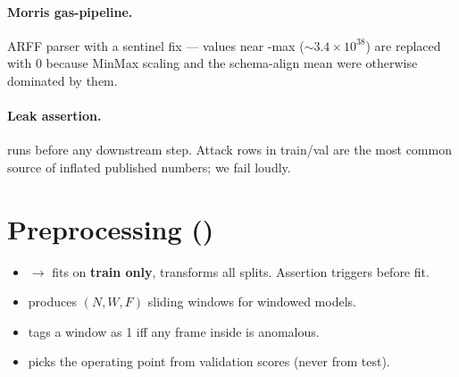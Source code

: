 \paragraph{Morris gas-pipeline.}  ARFF parser with a  sentinel fix --- values near -max ($\sim 3.4\!\times\!10^{38}$) are replaced with 0 because MinMax scaling and the schema-align mean were otherwise dominated by them.

\paragraph{Leak assertion.}   runs before any downstream step.  Attack rows in train/val are the most common source of inflated published numbers; we fail loudly.

\section{Preprocessing ()}

\begin{itemize}
  \item {}$\rightarrow$ fits  on \textbf{train only}, transforms all splits.  Assertion triggers before fit.
  \item {} produces $(N, W, F)$ sliding windows for windowed models.
  \item {} tags a window as 1 iff any frame inside is anomalous.
  \item {} picks the operating point from validation scores (never from test).
\end{itemize}

